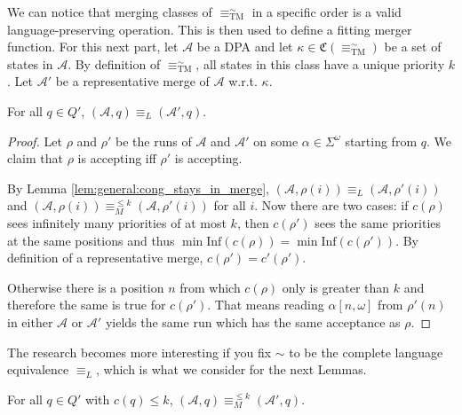\vspace{5pt}

We can notice that merging classes of $\equiv_\text{TM}^\sim$ in a specific order is a valid language-preserving operation. This is then used to define a fitting merger function. For this next part, let $\mathcal{A}$ be a DPA and let $\kappa \in \mathfrak{C}(\equiv^\sim_\text{TM})$ be a set of states in $\mathcal{A}$. By definition of $\equiv^\sim_\text{TM}$, all states in this class have a unique priority $k$. Let $\mathcal{A}'$ be a representative merge of $\mathcal{A}$ w.r.t. $\kappa$.

\begin{lem}
	For all $q \in Q'$, $(\mathcal{A}, q) \equiv_L (\mathcal{A}', q)$.
	\label{lem:tremoore:merge_keep_lang}
\end{lem}

\begin{proof} 
	Let $\rho$ and $\rho'$ be the runs of $\mathcal{A}$ and $\mathcal{A}'$ on some $\alpha \in \Sigma^\omega$ starting from $q$. We claim that $\rho$ is accepting iff $\rho'$ is accepting.
	
	By Lemma \ref{lem:general:cong_stays_in_merge}, $(\mathcal{A}, \rho(i)) \equiv_L (\mathcal{A}, \rho'(i))$ and $(\mathcal{A}, \rho(i)) \equiv_M^{\leq k} (\mathcal{A}, \rho'(i))$ for all $i$. Now there are two cases: if $c(\rho)$ sees infinitely many priorities of at most $k$, then $c(\rho')$ sees the same priorities at the same positions and thus $\min \text{Inf}(c(\rho)) = \min \text{Inf}(c(\rho'))$. By definition of a representative merge, $c(\rho') = c'(\rho')$.
	
	 Otherwise there is a position $n$ from which $c(\rho)$ only is greater than $k$ and therefore the same is true for $c(\rho')$. That means reading $\alpha[n,\omega]$ from $\rho'(n)$ in either $\mathcal{A}$ or $\mathcal{A}'$ yields the same run which has the same acceptance as $\rho$.
\end{proof}

\vspace{10pt}

The research becomes more interesting if you fix $\sim$ to be the complete language equivalence $\equiv_L$, which is what we consider for the next Lemmas.

\begin{lem}
	For all $q \in Q'$ with $c(q) \leq k$, $(\mathcal{A}, q) \equiv_M^{\leq k} (\mathcal{A}', q)$.
	\label{lem:tremoore:merge_keep_tmoore}
\end{lem}

